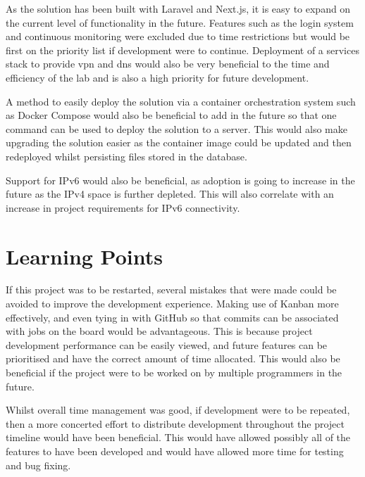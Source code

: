 As the solution has been built with Laravel and Next.js, it is easy to expand on the current level of functionality in the future. Features such as the login system and continuous monitoring were excluded due to time restrictions but would be first on the priority list if development were to continue. Deployment of a services stack to provide \gls{vpn} and \gls{dns} would also be very beneficial to the time and efficiency of the lab and is also a high priority for future development.

A method to easily deploy the solution via a container orchestration system such as Docker Compose would also be beneficial to add in the future so that one command can be used to deploy the solution to a server. This would also make upgrading the solution easier as the container image could be updated and then redeployed whilst persisting files stored in the database.

Support for IPv6 would also be beneficial, as adoption is going to increase in the future as the IPv4 space is further depleted. This will also correlate with an increase in project requirements for IPv6 connectivity.

\section{Learning Points}
\label{sec:learning-points}
If this project was to be restarted, several
mistakes that were made could be avoided to improve the development experience.
Making use of Kanban more effectively, and even tying in with GitHub so that
commits can be associated with jobs on the board would be advantageous. This is
because project development performance can be easily viewed, and future
features can be prioritised and have the correct amount of time allocated. This would also be beneficial if the project were to be worked on by multiple programmers in the future.

Whilst overall time management was good, if development were to be repeated, then a more concerted effort to distribute development throughout the project timeline would have been beneficial. This would have allowed possibly all of the features to have been developed and would have allowed more time for testing and bug fixing.